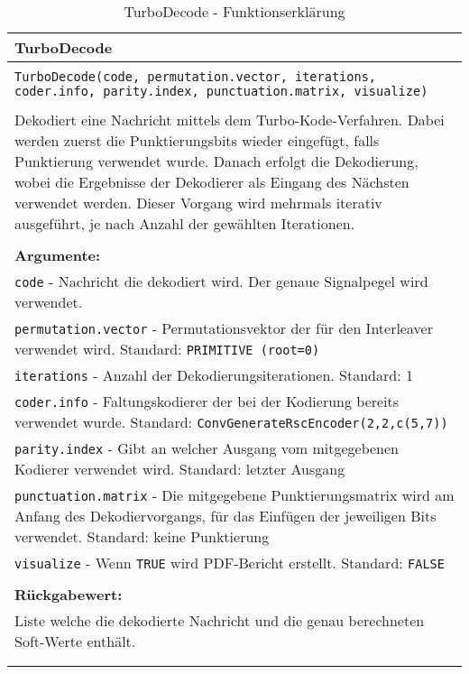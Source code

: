 \begin{longtable}{|p{\textwidth}|}
\hline
\rowcolor{lightblue}TurboDecode\\
\hline
\\
\texttt{TurboDecode(code, permutation.vector, iterations, coder.info, parity.index, punctuation.matrix, visualize)}\\
\\
Dekodiert eine Nachricht mittels dem Turbo-Kode-Verfahren. Dabei werden zuerst die Punktierungsbits wieder eingefügt, falls Punktierung verwendet wurde. Danach erfolgt die Dekodierung, wobei die Ergebnisse der Dekodierer als Eingang des Nächsten verwendet werden. Dieser Vorgang wird mehrmals iterativ ausgeführt, je nach Anzahl der gewählten Iterationen.\\
\\
\textbf{Argumente:}\\
\texttt{code} - Nachricht die dekodiert wird. Der genaue Signalpegel wird verwendet.\\
\texttt{permutation.vector} - Permutationsvektor der für den Interleaver verwendet wird. Standard: \texttt{PRIMITIVE (root=0)}\\
\texttt{iterations} - Anzahl der Dekodierungsiterationen. Standard: 1\\
\texttt{coder.info} - Faltungskodierer der bei der Kodierung bereits verwendet wurde. Standard: \texttt{ConvGenerateRscEncoder(2,2,c(5,7))}\\
\texttt{parity.index} - Gibt an welcher Ausgang vom mitgegebenen Kodierer verwendet wird. Standard: letzter Ausgang\\
\texttt{punctuation.matrix} - Die mitgegebene Punktierungsmatrix wird am Anfang des Dekodiervorgangs,  für das Einfügen der jeweiligen Bits verwendet. Standard: keine Punktierung\\
\texttt{visualize} - Wenn \texttt{TRUE} wird PDF-Bericht erstellt. Standard: \texttt{FALSE}\\
\\
\textbf{Rückgabewert:}\\
Liste welche die dekodierte Nachricht und die genau berechneten Soft-Werte enthält.\\
\\
\hline
\caption[TurboDecode]{TurboDecode - Funktionserklärung}
\end{longtable}